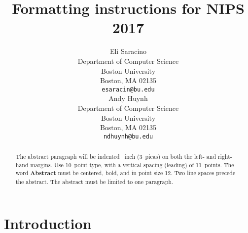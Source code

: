 \documentclass{article}
\title{Formatting instructions for NIPS 2017}
\author{
  Eli Saracino \\
  Department of Computer Science\\
  Boston University\\
  Boston, MA 02135 \\
  \texttt{esaracin@bu.edu} \\
  \And
  Andy Huynh \\
  Department of Computer Science \\
  Boston University \\
  Boston, MA 02135 \\
  \texttt{ndhuynh@bu.edu} \\
}
\begin{document}
\maketitle

\begin{abstract}
  The abstract paragraph will be indented ~inch
  (3~picas) on both the left- and right-hand margins. Use 10~point
  type, with a vertical spacing (leading) of 11~points.  The word
  \textbf{Abstract} must be centered, bold, and in point size 12. Two
  line spaces precede the abstract. The abstract must be limited to
  one paragraph.
\end{abstract}

\section{Introduction}
\end{document}
